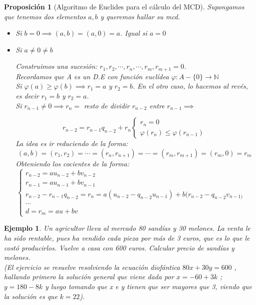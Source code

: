 \documentclass[11pt, a4paper, titlepage]{article}
\providecommand{\nat}{\mathbb{N}}
\theoremstyle{theorem-style}
\newtheorem*{nprop}{Proposición}
\theoremstyle{definition-style}
\theoremstyle{remark-style}
\theoremstyle{example-style}
\newtheorem*{ejemplo}{Ejemplo}
\begin{document}
\begin{nprop}[Algoritmo de Euclides para el cálculo del MCD]
Supongamos que tenemos dos elementos $a,b$ y queremos hallar su mcd.

\begin{itemize}
	
	\item Si $b=0 \implies (a,b) = (a,0) = a$. Igual si $a=0$
	
	\item Si $a \ne 0 \ne b$
	
	Construimos una sucesión: $r_1,r_2,\cdots, r_n, \cdots , r_m, r_{m+1} = 0$.\\
	Recordamos que A es un D.E con función euclídea $\varphi : A-\{0\} \to \nat $\\
	Si $\varphi(a) \geq \varphi(b)\implies r_1 = a$ y $r_2 = b$. En el otro caso, lo hacemos al revés, es decir  $r_1 = b $ y $r_2 = a$.\\
	Si $r_{n-1} \ne 0 \implies r_n= $ resto de dividir $r_{n-2}$ entre $r_{n-1} \implies$
	
	\[
	r_{n-2} = r_{n-1}q_{n-2} + r_n \begin{cases}
	 r_n = 0 \\
	  \varphi(r_n) \leq \varphi(r_{n-1})
\end{cases}
	 \]
La idea es ir reduciendo de la forma:
\[ (a,b) = (r_1,r_2) = \cdots = (r_n,r_{n+1}) = \cdots = (r_m, r_{m+1}) = (r_m,0) = r_m\]
Obteniendo los cocientes de la forma:
\[\begin{cases}
	r_{n-2} = au_{n-2} + bv_{n-2}\\

r_{n-1} = au_{n-1} + bv_{n-1}\\

r_{n-2} - r_{n-1}q_{n-2} = r_n = a(u_{n-2} - q_{n-2}u_{n-1}) + b(r_{n-2}-q_{n-2}v_{n-1)}\\
\cdots \\

d = r_m = au + bv
\end{cases}
\quad
\]
	
	\end{itemize}
\end{nprop}

\begin{ejemplo}
	Un agricultor lleva al mercado 80 sandías y 30 melones. La venta le ha sido rentable, pues ha vendido cada pieza por más de 3 euros, que es lo que le costó producirlos. Vuelve a casa con 600 euros. Calcular precio de sandías y melones.\\
	(El ejercicio se resuelve resolviendo la ecuación diofántica $80x +30y = 600$ , hallando primero la solución general que viene dada por $x = -60 + 3k$ ; $y = 180 - 8k$ y luego tomando que x e y tienen que ser mayores que 3, viendo que la solución es que $k=22$).
\end{ejemplo}
\end{document}
